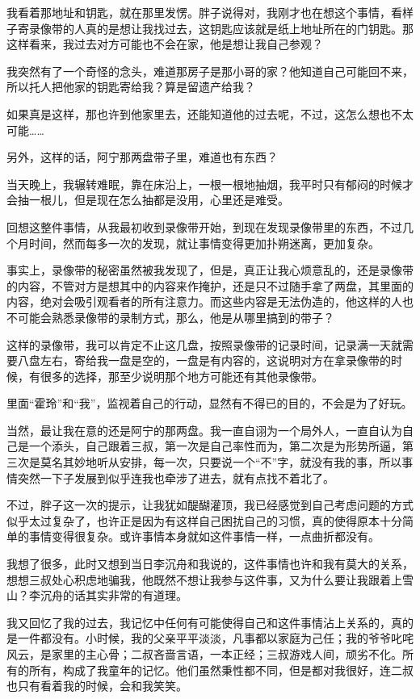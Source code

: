 我看着那地址和钥匙，就在那里发愣。胖子说得对，我刚才也在想这个事情，看样子寄录像带的人真的是想让我找过去，这钥匙应该就是纸上地址所在的门钥匙。那这样看来，我过去对方可能也不会在家，他是想让我自己参观？

我突然有了一个奇怪的念头，难道那房子是那小哥的家？他知道自己可能回不来，所以托人把他家的钥匙寄给我？算是留遗产给我？

如果真是这样，那也许到他家里去，还能知道他的过去呢，不过，这怎么想也不太可能……

另外，这样的话，阿宁那两盘带子里，难道也有东西？

当天晚上，我辗转难眠，靠在床沿上，一根一根地抽烟，我平时只有郁闷的时候才会抽一根儿，但是现在怎么抽都是没用，心里还是难受。

回想这整件事情，从我最初收到录像带开始，到现在发现录像带里的东西，不过几个月时间，然而每多一次的发现，就让事情变得更加扑朔迷离，更加复杂。

事实上，录像带的秘密虽然被我发现了，但是，真正让我心烦意乱的，还是录像带的内容，不管对方是想其中的内容来作掩护，还是只不过随手拿了两盘，其里面的内容，绝对会吸引观看者的所有注意力。而这些内容是无法伪造的，他这样的人也不可能会熟悉录像带的录制方式，那么，他是从哪里搞到的带子？

这样的录像带，我可以肯定不止这几盘，按照录像带的记录时间，记录满一天就需要八盘左右，寄给我一盘是空的，一盘是有内容的，这说明对方在拿录像带的时候，有很多的选择，那至少说明那个地方可能还有其他录像带。

里面“霍玲”和“我”，监视着自己的行动，显然有不得已的目的，不会是为了好玩。

当然，最让我在意的还是阿宁的那两盘。我一直自诩为一个局外人，一直自认为自己是一个添头，自己跟着三叔，第一次是自己率性而为，第二次是为形势所逼，第三次是莫名其妙地听从安排，每一次，只要说一个“不”字，就没有我的事，所以事情突然一下子发展到似乎连我也牵涉了进去，就有点找不着北了。

不过，胖子这一次的提示，让我犹如醍醐灌顶，我已经感觉到自己考虑问题的方式似乎太过复杂了，也许正是因为有这样自己困扰自己的习惯，真的使得原本十分简单的事情变得很复杂。或许事情本身就如这件事情一样，一点曲折都没有。

我想了很多，此时又想到当日李沉舟和我说的，这件事情也许和我有莫大的关系，想想三叔处心积虑地骗我，他既然不想让我参与这件事，又为什么要让我跟着上雪山？李沉舟的话其实非常的有道理。

我又回忆了我的过去，我记忆中任何有可能使得自己和这件事情沾上关系的，真的是一件都没有。小时候，我的父亲平平淡淡，凡事都以家庭为己任；我的爷爷叱咤风云，是家里的主心骨；二叔吝啬言语，一本正经；三叔游戏人间，顽劣不化。所有的所有，构成了我童年的记忆。他们虽然秉性都不同，但是都对我很好，连二叔也只有看着我的时候，会和我笑笑。

